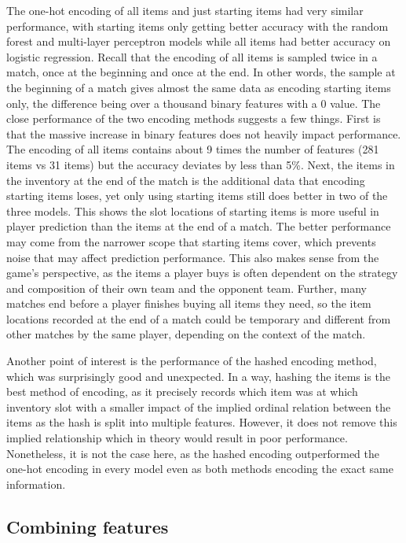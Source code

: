 \documentclass[Report.tex]{subfiles}
\begin{document}
The one-hot encoding of all items and just starting items had very similar performance, with starting items only getting better accuracy with the random forest and multi-layer perceptron models while all items had better accuracy on logistic regression. Recall that the encoding of all items is sampled twice in a match, once at the beginning and once at the end. In other words, the sample at the beginning of a match gives almost the same data as encoding starting items only, the difference being over a thousand binary features with a 0 value. The close performance of the two encoding methods suggests a few things. First is that the massive increase in binary features does not heavily impact performance. The encoding of all items contains about 9 times the number of features (281 items vs 31 items) but the accuracy deviates by less than 5\%. Next, the items in the inventory at the end of the match is the additional data that encoding starting items loses, yet only using starting items still does better in two of the three models. This shows the slot locations of starting items is more useful in player prediction than the items at the end of a match. The better performance may come from the narrower scope that starting items cover, which prevents noise that may affect prediction performance. This also makes sense from the game's perspective, as the items a player buys is often dependent on the strategy and composition of their own team and the opponent team. Further, many matches end before a player finishes buying all items they need, so the item locations recorded at the end of a match could be temporary and different from other matches by the same player, depending on the context of the match. 

Another point of interest is the performance of the hashed encoding method, which was surprisingly good and unexpected. In a way, hashing the items is the best method of encoding, as it precisely records which item was at which inventory slot with a smaller impact of the implied ordinal relation between the items as the hash is split into multiple features. However, it does not remove this implied relationship which in theory would result in poor performance. Nonetheless, it is not the case here, as the hashed encoding outperformed the one-hot encoding in every model even as both methods encoding the exact same information. 


\subsection{Combining features}
\end{document}
